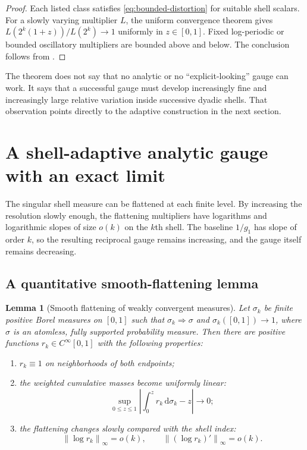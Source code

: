\documentclass[11pt,oneside]{article}
\numberwithin{equation}{section}
\newtheorem{lemma}[theorem]{Lemma}
\theoremstyle{definition}
\theoremstyle{remark}
\newcommand{\dd}{\,\mathrm d}
\newcommand{\norm}[1]{\left\lVert#1\right\rVert}
\begin{document}
\begin{proof}
Each listed class satisfies \eqref{eq:bounded-distortion} for suitable shell scalars.  For a
slowly varying multiplier \(L\), the uniform convergence theorem gives
\(L(2^k(1+z))/L(2^k)\to1\) uniformly in \(z\in[0,1]\).  Fixed log-periodic or bounded
oscillatory multipliers are bounded above and below.  The conclusion follows from
.
\end{proof}

\begin{pitfallbox}
The theorem does not say that no analytic or no ``explicit-looking'' gauge can work.  It
says that a successful gauge must develop increasingly fine and increasingly large relative
variation inside successive dyadic shells.  That observation points directly to the
adaptive construction in the next section.
\end{pitfallbox}

\section{A shell-adaptive analytic gauge with an exact limit}
\label{sec:adaptive}

The singular shell measure can be flattened at each finite level.  By increasing the
resolution slowly enough, the flattening multipliers have logarithms and logarithmic slopes
of size \(o(k)\) on the \(k\)th shell.  The baseline \(1/g_1\) has slope of order \(k\), so
the resulting reciprocal gauge remains increasing, and the gauge itself remains decreasing.

\subsection{A quantitative smooth-flattening lemma}

\begin{lemma}[Smooth flattening of weakly convergent measures]
\label{lem:flattening}
Let \(\sigma_k\) be finite positive Borel measures on \([0,1]\) such that
\(
 \sigma_k\Rightarrow\sigma
\) and \(\sigma_k([0,1])\to1\), where \(\sigma\) is an atomless, fully supported
probability measure.  Then there are positive functions \(r_k\in C^\infty[0,1]\) with the
following properties:
\begin{enumerate}
\item \(r_k\equiv1\) on neighborhoods of both endpoints;
\item the weighted cumulative masses become uniformly linear:
\begin{equation}
 \sup_{0\le z\le1}
 \left|\int_0^zr_k\dd\sigma_k-z\right|\longrightarrow0;
 \label{eq:flattening-CDF}
\end{equation}
\item the flattening changes slowly compared with the shell index:
\begin{equation}
 \norm{\log r_k}_\infty=o(k),
 \qquad
 \norm{(\log r_k)'}_\infty=o(k).
 \label{eq:flattening-bounds}
\end{equation}
\end{enumerate}
\end{lemma}
\end{document}
